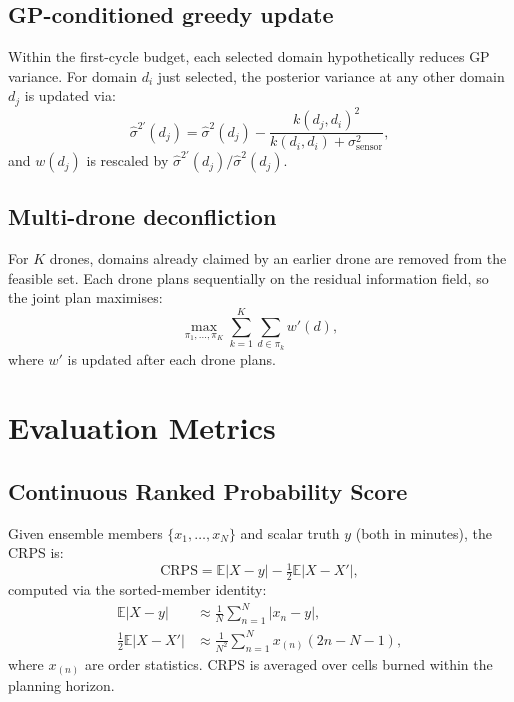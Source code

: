 \documentclass[11pt,twocolumn]{article}
\newcommand{\E}{\mathbb{E}}
\begin{document}
\subsection{GP-conditioned greedy update}

Within the first-cycle budget, each selected domain hypothetically
reduces GP variance.  For domain $d_i$ just selected, the posterior
variance at any other domain $d_j$ is updated via:
\begin{equation}
  \hat{\sigma}^{2\prime}(d_j) =
    \hat{\sigma}^2(d_j) -
    \frac{k(d_j,d_i)^2}{k(d_i,d_i)+\sigma^2_{\mathrm{sensor}}},\label{eq:gpupdate}
\end{equation}
and $w(d_j)$ is rescaled by $\hat{\sigma}^{2\prime}(d_j)/\hat{\sigma}^2(d_j)$.

\subsection{Multi-drone deconfliction}

For $K$ drones, domains already claimed by an earlier drone are
removed from the feasible set.  Each drone plans sequentially on the
residual information field, so the joint plan maximises:
\begin{equation}
  \max_{\pi_1,\ldots,\pi_K}\sum_{k=1}^K \sum_{d\in\pi_k} w'(d),\label{eq:joint}
\end{equation}
where $w'$ is updated after each drone plans.

\section{Evaluation Metrics}
\label{sec:eval}

\subsection{Continuous Ranked Probability Score}

Given ensemble members $\{x_1,\ldots,x_N\}$ and scalar truth $y$
(both in minutes), the CRPS is:
\begin{equation}
  \mathrm{CRPS} = \E|X-y| - \tfrac{1}{2}\E|X-X'|,\label{eq:crps}
\end{equation}
computed via the sorted-member identity:
\begin{align}
  \E|X-y| &\approx \frac{1}{N}\sum_{n=1}^N|x_n-y|,\label{eq:crps1}\\
  \tfrac{1}{2}\E|X-X'| &\approx
    \frac{1}{N^2}\sum_{n=1}^N x_{(n)}(2n-N-1),\label{eq:crps2}
\end{align}
where $x_{(n)}$ are order statistics.  CRPS is averaged over cells
burned within the planning horizon.
\end{document}
